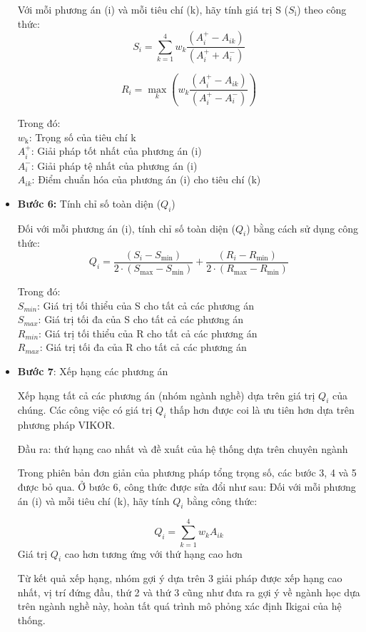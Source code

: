 \begin{itemize}
    Với mỗi phương án (i) và mỗi tiêu chí (k), hãy tính giá trị S ($S_{\text{i}}$) theo công thức:\\
    \[
S_i = \sum_{k=1}^{4} w_k \frac{{(A^{+}_i - A_{ik})}}{{(A^{+}_i + A^{-}_i)}}
\]

    \[
R_i = \max_{k} \left( w_k \frac{{(A^{+}_i - A_{ik})}}{{(A^{+}_i - A^{-}_i)}} \right)
\]

    Trong đó:\\
    $w_{\text{k}}$: Trọng số của tiêu chí k\\
    $A^{+}_i$: Giải pháp tốt nhất của phương án (i)\\
    $A^{-}_i$: Giải pháp tệ nhất của phương án (i)\\
    $A_{ik}$: Điểm chuẩn hóa của phương án (i) cho tiêu chí (k)

    \item \textbf{Bước 6:} Tính chỉ số toàn diện ($Q_{i}$)
    
    Đối với mỗi phương án (i), tính chỉ số toàn diện ($Q_{i}$) bằng cách sử dụng công thức:
    \[
        Q_i = \frac{{(S_i - S_{\text{min}})}}{{2 \cdot (S_{\text{max}} - S_{\text{min}})}} + \frac{{(R_i - R_{\text{min}})}}{{2 \cdot (R_{\text{max}} - R_{\text{min}})}}
    \]

    Trong đó: \\
    $S_{min}$: Giá trị tối thiểu của S cho tất cả các phương án \\
    $S_{max}$: Giá trị tối đa của S cho tất cả các phương án \\
    $R_{min}$: Giá trị tối thiểu của R cho tất cả các phương án \\
    $R_{max}$: Giá trị tối đa của R cho tất cả các phương án \\

    \item \textbf{Bước 7}: Xếp hạng các phương án

    Xếp hạng tất cả các phương án (nhóm ngành nghề) dựa trên giá trị $Q_i$ của chúng. Các công việc có giá trị $Q_i$ thấp hơn được coi là ưu tiên hơn dựa trên phương pháp VIKOR.
    
    Đầu ra: thứ hạng cao nhất và đề xuất của hệ thống dựa trên chuyên ngành
    
    Trong phiên bản đơn giản của phương pháp tổng trọng số, các bước 3, 4 và 5 được bỏ qua. Ở bước 6, công thức được sửa đổi như sau:
    Đối với mỗi phương án (i) và mỗi tiêu chí (k), hãy tính $Q_i$ bằng công thức:
    
    \[
Q_i = \sum_{k=1}^{4} w_k A_{ik}
\]
    Giá trị $Q_i$ cao hơn tương ứng với thứ hạng cao hơn
    
    Từ kết quả xếp hạng, nhóm gợi ý dựa trên 3 giải pháp được xếp hạng cao nhất, vị trí đứng đầu, thứ 2 và thứ 3 cũng như đưa ra gợi ý về ngành học dựa trên ngành nghề này, hoàn tất quá trình mô phỏng xác định Ikigai của hệ thống.
\end{itemize}



